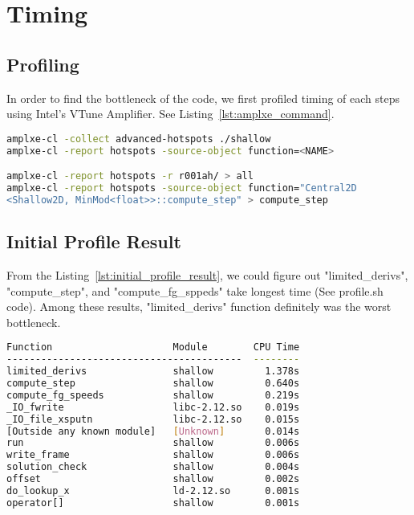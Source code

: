 \section{Timing}\label{sec:timing}
\subsection{Profiling}
In order to find the bottleneck of the code, we first profiled
 timing of each steps using Intel’s VTune Amplifier. See Listing~\ref{lst:amplxe_command}.

\begin{lstlisting}[caption={VTune Amplifier Command},label={lst:amplxe_command},frame=single,language=bash]
amplxe-cl -collect advanced-hotspots ./shallow
amplxe-cl -report hotspots -source-object function=<NAME>

amplxe-cl -report hotspots -r r001ah/ > all
amplxe-cl -report hotspots -source-object function="Central2D
<Shallow2D, MinMod<float>>::compute_step" > compute_step
\end{lstlisting}

\subsection{Initial Profile Result}

From the Listing~\ref{lst:initial_profile_result}, we could figure out "limited\_derivs", "compute\_step", and "compute\_fg\_sppeds" take longest time (See profile.sh code). Among these results, "limited\_derivs" function definitely was the worst bottleneck.

\begin{lstlisting}[caption={Initial Profile Result},label={lst:initial_profile_result},frame=single,language=bash]
Function                     Module        CPU Time
-----------------------------------------  --------
limited_derivs               shallow         1.378s
compute_step                 shallow         0.640s
compute_fg_speeds            shallow         0.219s
_IO_fwrite                   libc-2.12.so    0.019s
_IO_file_xsputn              libc-2.12.so    0.015s
[Outside any known module]   [Unknown]       0.014s
run                          shallow         0.006s
write_frame                  shallow         0.006s
solution_check               shallow         0.004s
offset                       shallow         0.002s
do_lookup_x                  ld-2.12.so      0.001s
operator[]                   shallow         0.001s
\end{lstlisting}

